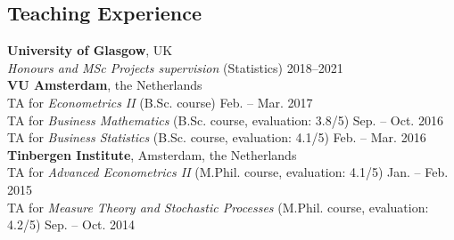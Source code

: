 \documentclass[margin,line]{resume}
\begin{document}
\begin{resume}
 
 \section{\mysidestyle Teaching Experience}
    \textbf{University of Glasgow}, UK\\ 
    \textit{Honours and MSc Projects supervision} (Statistics)  \hfill 2018--2021 \vspace{2mm}\\  	
    \textbf{VU Amsterdam}, the Netherlands \\ 
    TA for \textit{Econometrics II} (B.Sc. course)  \hfill Feb. -- Mar. 2017\\  	
    TA for \textit{Business Mathematics} (B.Sc. course, evaluation: 3.8/5)  \hfill Sep. -- Oct. 2016\\ 
    TA for \textit{Business Statistics} (B.Sc. course, evaluation: 4.1/5)  \hfill Feb. -- Mar. 2016\vspace{2mm}\\
   	\textbf{Tinbergen Institute}, Amsterdam, the Netherlands \\
    TA for \textit{Advanced Econometrics II} (M.Phil. course, evaluation: 4.1/5) \hfill Jan. -- Feb. 2015\\      
	TA for \textit{Measure Theory and Stochastic Processes} (M.Phil. course, evaluation: 4.2/5) \hfill Sep. -- Oct. 2014\\

\vspace{-5mm}


\end{resume}
\end{document}
